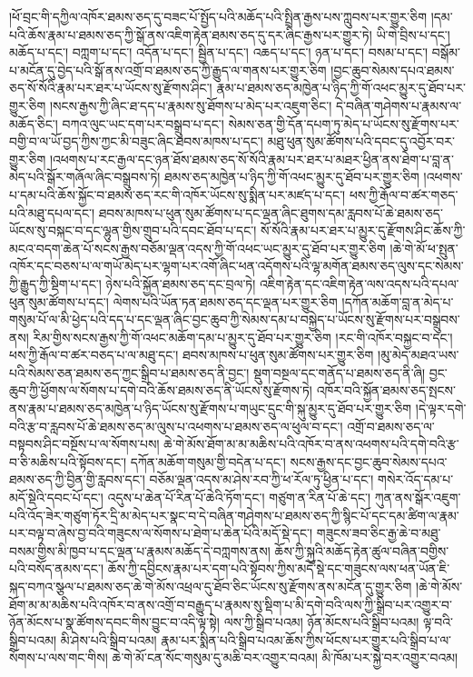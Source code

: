 །ཕོ་བྲང་གི་དཀྱིལ་འཁོར་ཐམས་ཅད་དུ་བཟང་པོ་སྤྱོད་པའི་མཆོད་པའི་སྤྲིན་རྒྱས་པས་ཀླུབས་པར་གྱུར་ཅིག །དམ་པའི་ཆོས་རྣམ་པ་ཐམས་ཅད་ཀྱི་སྒོ་ནས་འཇིག་རྟེན་ཐམས་ཅད་དུ་དར་ཞིང་རྒྱས་པར་གྱུར་ཏེ། ཡི་གེ་བྲིས་པ་དང་། མཆོད་པ་དང་། བཀླག་པ་དང་། འདོན་པ་དང་། སྦྱིན་པ་དང་། འཆད་པ་དང་། ཉན་པ་དང་། བསམ་པ་དང་། བསྒོམ་པ་མངོན་དུ་བྱེད་པའི་སྒོ་ནས་འགྲོ་བ་ཐམས་ཅད་ཀྱི་རྒྱུད་ལ་གནས་པར་གྱུར་ཅིག །བྱང་ཆུབ་སེམས་དཔའ་ཐམས་ཅད་སོ་སོའི་རྣམ་པར་ཐར་པ་ཡོངས་སུ་རྫོགས་ཤིང་། རྣམ་པ་ཐམས་ཅད་མཁྱེན་པ་ཉིད་ཀྱི་གོ་འཕང་མྱུར་དུ་ཐོབ་པར་གྱུར་ཅིག །སངས་རྒྱས་ཀྱི་ཞིང་ཐ་དད་པ་རྣམས་སུ་ཐོགས་པ་མེད་པར་འཇུག་ཅིང་། དེ་བཞིན་གཤེགས་པ་རྣམས་ལ་མཆོད་ཅིང་། བཀའ་ལུང་ཡང་དག་པར་བསྒྲུབ་པ་དང་། སེམས་ཅན་གྱི་དོན་དཔག་ཏུ་མེད་པ་ཡོངས་སུ་རྫོགས་པར་བགྱི་བ་ལ་ཡོ་བྱད་ཀྱིས་ཀྱང་མི་བཟུང་ཞིང་ཐབས་མཁས་པ་དང་། མཐུ་ཕུན་སུམ་ཚོགས་པའི་དབང་དུ་འབྱོར་བར་གྱུར་ཅིག །འཕགས་པ་རང་རྒྱལ་དང་ཉན་ཐོས་ཐམས་ཅད་སོ་སོའི་རྣམ་པར་ཐར་པ་མཐར་ཕྱིན་ནས་ཐེག་པ་བླ་ན་མེད་པའི་སྒོར་གཞོལ་ཞིང་བསྒྲུབས་ཏེ། ཐམས་ཅད་མཁྱེན་པ་ཉིད་ཀྱི་གོ་འཕང་མྱུར་དུ་ཐོབ་པར་གྱུར་ཅིག །འཕགས་པ་དམ་པའི་ཆོས་སྐྱོང་བ་ཐམས་ཅད་རང་གི་འཁོར་ཡོངས་སུ་སྨིན་པར་མཛད་པ་དང་། ཕས་ཀྱི་རྒོལ་བ་ཚར་གཅད་པའི་མཐུ་དཔལ་དང་། ཐབས་མཁས་པ་ཕུན་སུམ་ཚོགས་པ་དང་ལྡན་ཞིང་ཐུགས་དམ་རླབས་པོ་ཆེ་ཐམས་ཅད་ཡོངས་སུ་བསྐང་བ་དང་ལྷུན་གྱིས་གྲུབ་པའི་དབང་ཐོབ་པ་དང་། སོ་སོའི་རྣམ་པར་ཐར་པ་མྱུར་དུ་རྫོགས་ཤིང་ཆོས་ཀྱི་མངའ་བདག་ཆེན་པོ་སངས་རྒྱས་བཅོམ་ལྡན་འདས་ཀྱི་གོ་འཕང་ཡང་མྱུར་དུ་ཐོབ་པར་གྱུར་ཅིག །ཆེ་གེ་མོ་ཕ་སྤུན་འཁོར་དང་བཅས་པ་ལ་གཡོ་མེད་པར་ལྷག་པར་འགོ་ཞིང་ཕན་འདོགས་པའི་ལྷ་མགོན་ཐམས་ཅད་ལུས་དང་སེམས་ཀྱི་རྒྱུད་ཀྱི་སྡིག་པ་དང་། ཉེས་པའི་སྐྱོན་ཐམས་ཅད་དང་བྲལ་ཏེ། འཇིག་རྟེན་དང་འཇིག་རྟེན་ལས་འདས་པའི་དཔལ་ཕུན་སུམ་ཚོགས་པ་དང་། ལེགས་པའི་ཡོན་ཏན་ཐམས་ཅད་དང་ལྡན་པར་གྱུར་ཅིག །དཀོན་མཆོག་བླ་ན་མེད་པ་གསུམ་པོ་ལ་མི་ཕྱེད་པའི་དད་པ་དང་ལྡན་ཞིང་བྱང་ཆུབ་ཀྱི་སེམས་དམ་པ་བསྐྱེད་པ་ཡོངས་སུ་རྫོགས་པར་བསྒྲུབས་ནས། རིམ་གྱིས་སངས་རྒྱས་ཀྱི་གོ་འཕང་མཆོག་དམ་པ་མྱུར་དུ་ཐོབ་པར་གྱུར་ཅིག །རང་གི་འཁོར་བསྐྱང་བ་དང་། ཕས་ཀྱི་རྒོལ་བ་ཚར་བཅད་པ་ལ་མཐུ་དང་། ཐབས་མཁས་པ་ཕུན་སུམ་ཚོགས་པར་གྱུར་ཅིག །མུ་མེད་མཐའ་ཡས་པའི་སེམས་ཅན་ཐམས་ཅད་ཀྱང་སྒྲིབ་པ་ཐམས་ཅད་ནི་བྱང་། སྡུག་བསྔལ་དང་གནོད་པ་ཐམས་ཅད་ནི་ཞི། བྱང་ཆུབ་ཀྱི་ཕྱོགས་ལ་སོགས་པ་དགེ་བའི་ཆོས་ཐམས་ཅད་ནི་ཡོངས་སུ་རྫོགས་ཏེ། འཁོར་བའི་སྐྱོན་ཐམས་ཅད་སྤངས་ནས་རྣམ་པ་ཐམས་ཅད་མཁྱེན་པ་ཉིད་ཡོངས་སུ་རྫོགས་པ་གཡུང་དྲུང་གི་སྐུ་མྱུར་དུ་ཐོབ་པར་གྱུར་ཅིག །དེ་ལྟར་དགེ་བའི་རྩ་བ་རླབས་པོ་ཆེ་ཐམས་ཅད་མ་ལུས་པ་འཕགས་པ་ཐམས་ཅད་ལ་ཕུལ་བ་དང་། འགྲོ་བ་ཐམས་ཅད་ལ་བསྟབས་ཤིང་བསྔོས་པ་ལ་སོགས་པས། ཆེ་གེ་མོས་ཐོག་མ་མ་མཆིས་པའི་འཁོར་བ་ནས་འཕགས་པའི་དགེ་བའི་རྩ་བ་ཅི་མཆིས་པའི་སྟོབས་དང་། དཀོན་མཆོག་གསུམ་གྱི་བདེན་པ་དང་། སངས་རྒྱས་དང་བྱང་ཆུབ་སེམས་དཔའ་ཐམས་ཅད་ཀྱི་བྱིན་གྱི་རླབས་དང་། བཅོམ་ལྡན་འདས་མ་ཤེས་རབ་ཀྱི་ཕ་རོལ་ཏུ་ཕྱིན་པ་དང་། གསེར་འོད་དམ་པ་མདོ་སྡེའི་དབང་པོ་དང་། འདུས་པ་ཆེན་པོ་རིན་པོ་ཆེའི་ཏོག་དང་། གཙུག་ན་རིན་པོ་ཆེ་དང་། ཀུན་ནས་སྒོར་འཇུག་པའི་འོད་ཟེར་གཙུག་ཏོར་དྲི་མ་མེད་པར་སྣང་བ་དེ་བཞིན་གཤེགས་པ་ཐམས་ཅད་ཀྱི་སྙིང་པོ་དང་དམ་ཚིག་ལ་རྣམ་པར་བལྟ་བ་ཞེས་བྱ་བའི་གཟུངས་ལ་སོགས་པ་ཐེག་པ་ཆེན་པོའི་མདོ་སྡེ་དང་། གཟུངས་ཟབ་ཅིང་རྒྱ་ཆེ་བ་མཐུ་བསམ་གྱིས་མི་ཁྱབ་པ་དང་ལྡན་པ་རྣམས་མཆོད་དེ་བཀླགས་ནས། ཆོས་ཀྱི་སྐུའི་མཆོད་རྟེན་ཚུལ་བཞིན་བགྱིས་པའི་བསོད་ནམས་དང་། ཆོས་ཀྱི་དབྱིངས་རྣམ་པར་དག་པའི་སྟོབས་ཀྱིས་མདོ་སྡེ་དང་གཟུངས་ལས་ཕན་ཡོན་ཇི་སྐད་བཀའ་སྩལ་པ་ཐམས་ཅད་ཆེ་གེ་མོས་འཕྲལ་དུ་ཐོབ་ཅིང་ཡོངས་སུ་རྫོགས་ནས་མངོན་དུ་གྱུར་ཅིག །ཆེ་གེ་མོས་ཐོག་མ་མ་མཆིས་པའི་འཁོར་བ་ནས་འགྲོ་བ་བརྒྱུད་པ་རྣམས་སུ་སྡིག་པ་མི་དགེ་བའི་ལས་ཀྱི་སྒྲིབ་པར་འགྱུར་བ་ཉོན་མོངས་པ་སྣ་ཚོགས་དབང་གིས་བྱུང་བ་འདི་ལྟ་སྟེ། ལས་ཀྱི་སྒྲིབ་པའམ། ཉོན་མོངས་པའི་སྒྲིབ་པའམ། ལྟ་བའི་སྒྲིབ་པའམ། མི་ཤེས་པའི་སྒྲིབ་པའམ། རྣམ་པར་སྨིན་པའི་སྒྲིབ་པའམ་ཆོས་ཀྱིས་ཕོངས་པར་གྱུར་པའི་སྒྲིབ་པ་ལ་སོགས་པ་ལས་གང་གིས། ཆེ་གེ་མོ་ངན་སོང་གསུམ་དུ་མཆི་བར་འགྱུར་བའམ། མི་ཁོམ་པར་སྐྱེ་བར་འགྱུར་བའམ། 